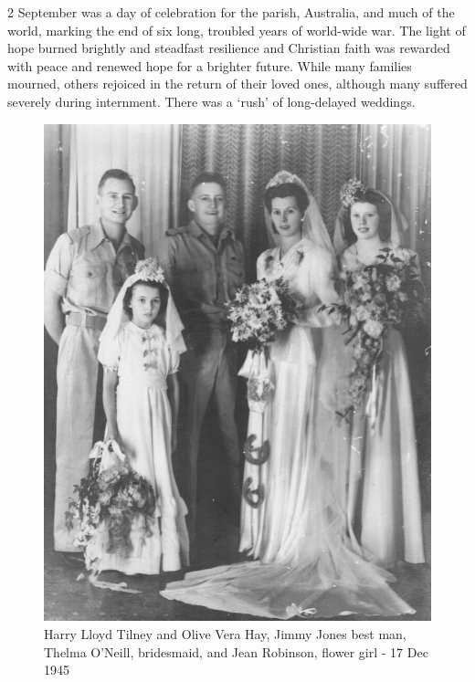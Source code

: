 2 September was a day of celebration for the parish, Australia, and much of the world, marking the end of six long, troubled years of world-wide war. The light of hope burned brightly and steadfast resilience and Christian faith was rewarded with peace and renewed hope for a brighter future. While many families mourned, others rejoiced in the return of their loved ones, although many suffered severely during internment. There was a `rush' of long-delayed weddings.









\begin{figure}
\begin{center}
\includegraphics[width=1.\linewidth,center]{../images/OliveAndSnowTilneyWedding17121945.jpg}
\caption{Harry Lloyd Tilney and Olive Vera Hay, Jimmy Jones best man, Thelma O'Neill, bridesmaid, and Jean Robinson, flower girl - 17 Dec 1945}
\end{center}
\end{figure}




